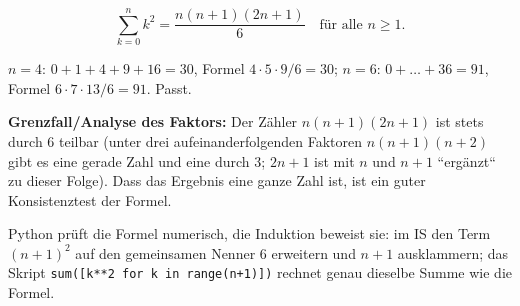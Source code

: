 \begin{ergebnis}
\begin{equation*}
  \sum_{k=0}^{n} k^2=\frac{n(n+1)(2n+1)}6\quad\text{für alle }n\ge1 .
\end{equation*}
\end{ergebnis}

\begin{kontrolle}
$n=4$: $0+1+4+9+16=30$, Formel $4\cdot5\cdot9/6=30$; $n=6$:
$0+\dots+36=91$, Formel $6\cdot7\cdot13/6=91$. Passt.

\textbf{Grenzfall/Analyse des Faktors:} Der Zähler $n(n+1)(2n+1)$ ist
stets durch $6$ teilbar (unter drei aufeinanderfolgenden Faktoren
$n(n+1)(n+2)$ gibt es eine gerade Zahl und eine durch $3$; $2n+1$
ist mit $n$ und $n+1$ ``ergänzt`` zu dieser Folge). Dass das Ergebnis
eine ganze Zahl ist, ist ein guter Konsistenztest der Formel.
\end{kontrolle}

\begin{merksatz}
Python prüft die Formel numerisch, die Induktion beweist sie: im IS den
Term $(n+1)^2$ auf den gemeinsamen Nenner $6$ erweitern und $n+1$
ausklammern; das Skript \texttt{sum([k**2 for k in range(n+1)])}
rechnet genau dieselbe Summe wie die Formel.
\end{merksatz}
